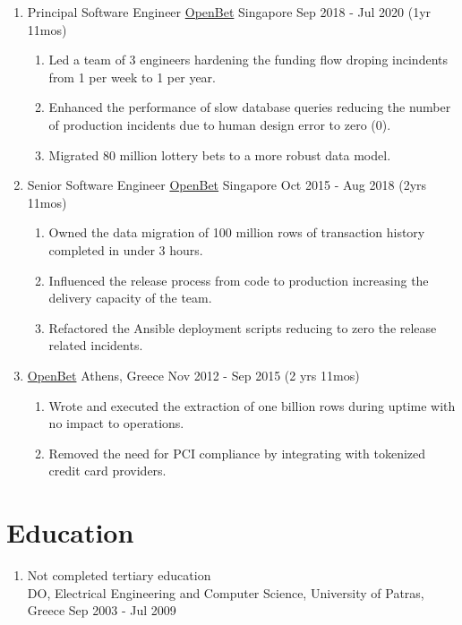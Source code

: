 \documentclass{CVSoftwareEngineer}
\begin{document}
\begin{enumerate}[labelwidth=!, labelindent=0pt, leftmargin=*, rightmargin=15pt]
		\item[] \cvExperience
			{Principal Software Engineer}
			{\href{https://www.openbet.com/}{OpenBet}}
			{Singapore}
			{Sep 2018 - Jul 2020 (1yr 11mos)}
			{\begin{enumerate}[labelwidth=!, labelindent=0pt, nosep, leftmargin=*]
					\item[\textasteriskcentered] Led a team of 3 engineers hardening the
						funding flow droping incindents from 1 per week to 1 per year.
					\item[\textasteriskcentered] Enhanced the performance of slow database queries reducing
						the number of production incidents due to human design error to zero (0).
					\item[\textasteriskcentered] Migrated 80 million lottery bets to a more robust data model.
				\end{enumerate}
			}

		\item[] \cvExperience
			{Senior Software Engineer}
			{\href{https://www.openbet.com/}{OpenBet}}
			{Singapore}
			{Oct 2015 - Aug 2018 (2yrs 11mos)}
			{
				\begin{enumerate}[labelwidth=!, labelindent=0pt, nosep, leftmargin=*]
					\item[\textasteriskcentered] Owned the data migration of 100 million rows of
						transaction history completed in under 3 hours.
					\item[\textasteriskcentered] Influenced the release process from code to
						production increasing the delivery capacity of the team.
					\item[\textasteriskcentered] Refactored the Ansible deployment scripts
						reducing to zero the release related incidents.
				\end{enumerate}
			}

		\item[]  
			{\href{https://www.openbet.com/}{OpenBet}}
			{Athens, Greece}
			{Nov 2012 - Sep 2015 (2 yrs 11mos)}
			{
				\begin{enumerate}[labelwidth=!, labelindent=0pt, nosep, leftmargin=*]
					\item[\textasteriskcentered] Wrote and executed the extraction of
						one billion rows during uptime with no impact to operations.
					\item[\textasteriskcentered] Removed the need for PCI compliance by
						integrating with tokenized credit card providers.
				\end{enumerate}
			}
	\end{enumerate}

	\section{Education}
	\begin{enumerate}[labelwidth=!, labelindent=0pt, leftmargin=*, rightmargin=15pt]
		\item[] Not completed tertiary education \\
			DO, Electrical Engineering and Computer Science, University of Patras, Greece \hfill {\scriptsize Sep 2003 - Jul 2009}
	\end{enumerate}
\end{document}
